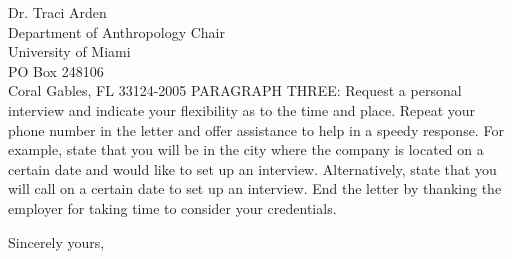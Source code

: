 \documentclass[11pt]{letter} %
\begin{document}
\begin{letter}{Dr. Traci Arden \\
Department of Anthropology Chair \\
University of Miami \\
PO Box 248106 \\
Coral Gables, FL 33124-2005}
PARAGRAPH THREE: Request a personal interview and indicate your flexibility as to the time and place. Repeat your phone number in the letter and offer assistance to help in a speedy response. For example, state that you will be in the city where the company is located on a certain date and would like to set up an interview. Alternatively, state that you will call on a certain date to set up an interview. End the letter by thanking the employer for taking time to consider your credentials. 

\closing{Sincerely yours,}




\end{letter}
\end{document}
